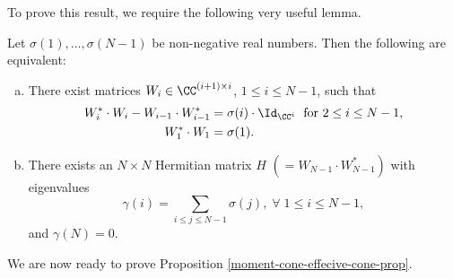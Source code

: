 To prove this result, we require the following very useful lemma.

\begin{lemma}
\label{lemma:moment-matrices}
Let $\sigma(1), \ldots, \sigma(N-1)$ be non-negative real numbers. Then the following are equivalent:
			\begin{enumerate}[(a)]
				\item There exist matrices $W_i \in \CC^{(i+1)\times i}$, $1 \leq i \leq N-1$, such that 
				\begin{align*}
				W_i^* \cdot W_i - W_{i-1} \cdot W_{i-1}^* &= \sigma(i) \cdot \Id_{\CC^i} \; \text{ for } 2 \leq i \leq N-1,\\
				W_1^* \cdot W_1 &=\sigma(1).
				\end{align*}
				\item There exists an $N \times N$ Hermitian matrix $H$ $\left(= W_{N-1} \cdot W_{N-1}^* \right)$ with eigenvalues 
				\[
				\gamma(i) = \sum_{i \leq j \leq N-1} \sigma(j), \; \forall \; 1 \leq i \leq N-1,
				\]
				and $\gamma(N) = 0$.
			\end{enumerate}
\end{lemma}

We are now ready to prove Proposition \ref{moment-cone-effecive-cone-prop}.
 
